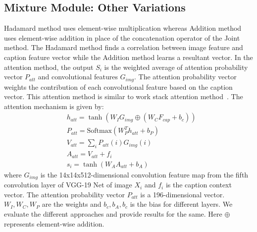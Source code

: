 \documentclass[11pt,a4paper]{article}
\begin{document}
 \subsection{Mixture Module: Other Variations} Hadamard method uses element-wise multiplication whereas {Addition method} uses element-wise addition in place of the concatenation operator of the Joint method. The Hadamard method finds a correlation between image feature and caption feature vector while the Addition method learns a resultant vector.
In the attention method, the output $S_{i}$ is the weighted average of attention probability vector $P_{att}$ and convolutional features $G_{img}$. The attention probability vector weights the contribution of each convolutional feature based on the caption vector. This attention method is similar to work stack attention method~\cite{Yang_CVPR2016}. The attention mechanism is given by:
\begin{equation}
    \begin{split}
        & h_{att}= \tanh({W_I}{G_{img}} \oplus ({W_C}{F_{cap}}+{b_c})) \\
        & P_{att}= \mbox{Softmax}({W^T_P}{h_{att}}+{b_P}) \\
        & V_{att}= \sum_{i}{P_{att}(i)}{G_{img}(i)}\\
        & A_{att}= V_{att} + f_{i} \\
        & s_{i}=\tanh({W_A} A_{att} + b_A)
    \end{split}
\end{equation}
where $G_{img}$ is  the 14x14x512-dimensional  convolution feature map from the fifth convolution layer of VGG-19 Net of image $X_{i}$ and $f_{i}$ is the caption context vector. The attention probability vector $P_{att}$ is a 196-dimensional vector. $W_{I},W_{C},W_{P}$ are the weights and $b_c, b_A, b_c $ is the bias for different layers. We evaluate the different approaches and provide results for the same. Here $\oplus$ represents element-wise addition.
\end{document}
